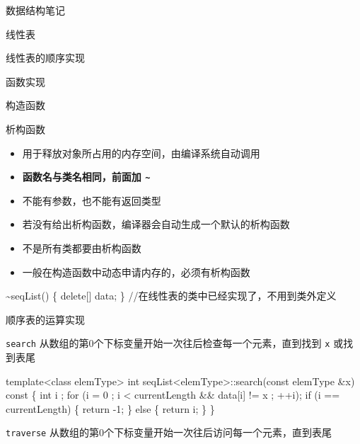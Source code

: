 \documentclass[
  ignorenonframetext,
]{beamer}
\newenvironment{Shaded}{}{}
\newcommand{\NormalTok}[1]{#1}
\providecommand{\tightlist}{%
  \setlength{\itemsep}{0pt}\setlength{\parskip}{0pt}}
\begin{document}
\begin{frame}[fragile]{数据结构笔记}
\begin{block}{线性表}
\begin{block}{线性表的顺序实现}
\begin{block}{函数实现}
\begin{block}{构造函数}
\end{block}

\begin{block}{析构函数}
\protect{}\label{ux6790ux6784ux51fdux6570}
\begin{itemize}
\tightlist
\item
  用于释放对象所占用的内存空间，由编译系统自动调用
\item
  \textbf{函数名与类名相同，前面加 \texttt{\textasciitilde{}}}
\item
  不能有参数，也不能有返回类型
\item
  若没有给出析构函数，编译器会自动生成一个默认的析构函数
\item
  不是所有类都要由析构函数
\item
  一般在构造函数中动态申请内存的，必须有析构函数
\end{itemize}

\begin{Shaded}
\begin{Highlighting}[]
\NormalTok{\textasciitilde{}seqList()}
\NormalTok{\{}
\NormalTok{  delete[] data;}
\NormalTok{\}  //在线性表的类中已经实现了，不用到类外定义}
\end{Highlighting}
\end{Shaded}
\end{block}

\begin{block}{顺序表的运算实现}
\protect{}\label{ux987aux5e8fux8868ux7684ux8fd0ux7b97ux5b9eux73b0}
\begin{block}{\texttt{search}}
\protect{}\label{search}
从数组的第0个下标变量开始一次往后检查每一个元素，直到找到 \texttt{x}
或找到表尾

\begin{Shaded}
\begin{Highlighting}[]
\NormalTok{template\textless{}class elemType\textgreater{}}
\NormalTok{int seqList\textless{}elemType\textgreater{}::search(const elemType \&x) const}
\NormalTok{\{}
\NormalTok{  int i ;}
\NormalTok{  for (i = 0 ; i \textless{} currentLength \&\& data[i] != x ; ++i);}
\NormalTok{  if (i == currentLength) }
\NormalTok{  \{}
\NormalTok{    return {-}1;}
\NormalTok{  \}}
\NormalTok{  else}
\NormalTok{  \{}
\NormalTok{    return i;}
\NormalTok{  \}}
\NormalTok{\}}
\end{Highlighting}
\end{Shaded}
\end{block}

\begin{block}{\texttt{traverse}}
\protect{}\label{traverse}
从数组的第0个下标变量开始一次往后访问每一个元素，直到表尾


\end{block}
\end{block}
\end{block}
\end{block}
\end{block}
\end{frame}
\end{document}
